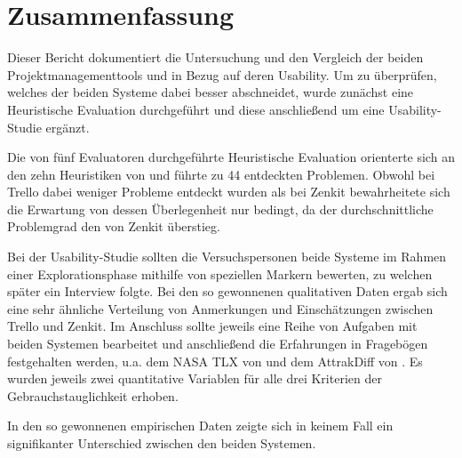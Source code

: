 \newpage
\section{Zusammenfassung}
Dieser Bericht dokumentiert die Untersuchung und den Vergleich der beiden Projektmanagementtools \cite{trello} und \cite{zenkit} in Bezug auf deren Usability. Um zu überprüfen, welches der beiden Systeme dabei besser abschneidet, wurde zunächst eine Heuristische Evaluation durchgeführt und diese anschließend um eine Usability-Studie ergänzt.

Die von fünf Evaluatoren durchgeführte Heuristische Evaluation orienterte sich an den zehn Heuristiken von \cite{nielsen199510} und führte zu 44 entdeckten Problemen. Obwohl bei Trello dabei weniger Probleme entdeckt wurden als bei Zenkit bewahrheitete sich die Erwartung von dessen Überlegenheit nur bedingt, da der durchschnittliche Problemgrad den von Zenkit überstieg.

Bei der Usability-Studie sollten die Versuchspersonen beide Systeme im Rahmen einer Explorationsphase mithilfe von speziellen Markern bewerten, zu welchen später ein Interview folgte. Bei den so gewonnenen qualitativen Daten ergab sich eine sehr ähnliche Verteilung von Anmerkungen und Einschätzungen zwischen Trello und Zenkit.
Im Anschluss sollte jeweils eine Reihe von Aufgaben mit beiden Systemen bearbeitet und anschließend die Erfahrungen in Fragebögen festgehalten werden, u.a. dem NASA TLX von \cite{hart1988development} und dem AttrakDiff von \cite{hassenzahl2003attrakdiff}. Es wurden jeweils zwei quantitative Variablen für alle drei Kriterien der Gebrauchstauglichkeit erhoben.

In den so gewonnenen empirischen Daten zeigte sich in keinem Fall ein signifikanter Unterschied zwischen den beiden Systemen.

\newpage